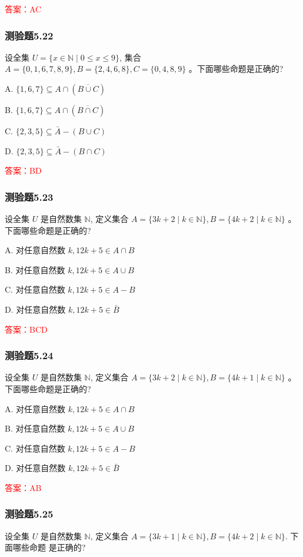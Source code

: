\documentclass[UTF8, heading=true]{ctexart}
\begin{document}
\textcolor{red}{答案：AC}

\subsubsection{测验题5.22}

设全集 $U=\{x \in \mathbb{N} \mid 0 \leq x \leq 9\}$, 
集合 $A=\{0,1,6,7,8,9\}, B=\{2,4,6,8\}, C=\{0,4,8,9\}$ 。下面哪些命题是正确的?

A. $\{1,6,7\} \subseteq A \cap(\overline{B \cup C})$

B. $\{1,6,7\} \subseteq A \cap(\overline{B \cap C})$

C. $\{2,3,5\} \subseteq \bar{A}-(B \cup C)$

D. $\{2,3,5\} \subseteq \bar{A}-(B \cap C)$

\textcolor{red}{答案：BD}

\subsubsection{测验题5.23}
设全集 $U$ 是自然数集 $\mathbb{N}$, 定义集合 $A=\{3 k+2 \mid k \in \mathbb{N}\}, B=\{4 k+2 \mid k \in \mathbb{N}\}$ 。下面哪些命题是正确的?

A. 对任意自然数 $k, 12 k+5 \in A \cap B$

B. 对任意自然数 $k, 12 k+5 \in A \cup B$

C. 对任意自然数 $k, 12 k+5 \in A-B$

D. 对任意自然数 $k, 12 k+5 \in \bar{B}$

\textcolor{red}{答案：BCD}

\subsubsection{测验题5.24}

设全集 $U$ 是自然数集 $\mathbb{N}$, 定义集合 $A=\{3 k+2 \mid k \in \mathbb{N}\}, B=\{4 k+1 \mid k \in \mathbb{N}\}$ 。下面哪些命题是正确的?

A. 对任意自然数 $k, 12 k+5 \in A \cap B$

B. 对任意自然数 $k, 12 k+5 \in A \cup B$

C. 对任意自然数 $k, 12 k+5 \in A-B$

D. 对任意自然数 $k, 12 k+5 \in \bar{B}$

\textcolor{red}{答案：AB}

\subsubsection{测验题5.25}
设全集 $U$ 是自然数集 $\mathbb{N}$, 定义集合 $A=\{3 k+1 \mid k \in \mathbb{N}\}, B=\{4 k+2 \mid k \in \mathbb{N}\}$. 下面哪些命题
是正确的?
\end{document}
